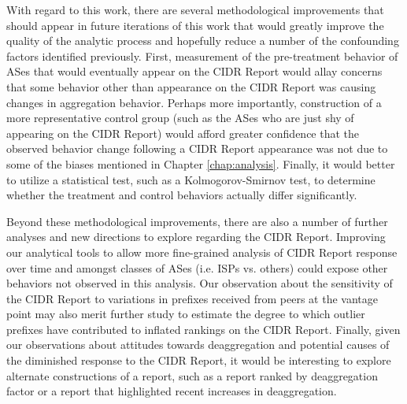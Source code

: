 With regard to this work, there are several methodological improvements that
should appear in future iterations of this work that would greatly improve the
quality of the analytic process and hopefully reduce a number of the
confounding factors identified previously. First, measurement of the
pre-treatment behavior of ASes that would eventually appear on the CIDR Report
would allay concerns that some behavior other than appearance on the CIDR
Report was causing changes in aggregation behavior. Perhaps more importantly,
construction of a more representative control group (such as the ASes who are
just shy of appearing on the CIDR Report) would afford greater confidence that
the observed behavior change following a CIDR Report appearance was not due to
some of the biases mentioned in Chapter \ref{chap:analysis}. Finally, it would
better to utilize a statistical test, such as a Kolmogorov-Smirnov test, to
determine whether the treatment and control behaviors actually differ
significantly.

Beyond these methodological improvements, there are also a number of further
analyses and new directions to explore regarding the CIDR Report. Improving our
analytical tools to allow more fine-grained analysis of CIDR Report response
over time and amongst classes of ASes (i.e. ISPs vs. others) could expose other
behaviors not observed in this analysis. Our observation about the sensitivity
of the CIDR Report to variations in prefixes received from peers at the vantage
point may also merit further study to estimate the degree to which outlier
prefixes have contributed to inflated rankings on the CIDR Report.  Finally,
given our observations about attitudes towards deaggregation and potential
causes of the diminished response to the CIDR Report, it would be interesting
to explore alternate constructions of a report, such as a report ranked by
deaggregation factor or a report that highlighted recent increases in
deaggregation.


